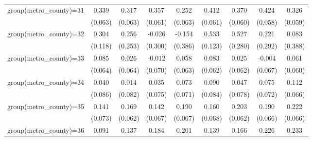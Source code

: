 {\begin{tabular}{l*{8}{c}}
group(metro\_county)=31&       0.339\sym{***}&       0.317\sym{***}&       0.357\sym{***}&       0.252\sym{***}&       0.412\sym{***}&       0.370\sym{***}&       0.424\sym{***}&       0.326\sym{***}\\
                    &     (0.063)         &     (0.063)         &     (0.061)         &     (0.063)         &     (0.061)         &     (0.060)         &     (0.058)         &     (0.059)         \\
group(metro\_county)=32&       0.304\sym{**} &       0.256         &      -0.026         &      -0.154         &       0.533\sym{***}&       0.527\sym{*}  &       0.221         &       0.083         \\
                    &     (0.118)         &     (0.253)         &     (0.300)         &     (0.386)         &     (0.123)         &     (0.280)         &     (0.292)         &     (0.388)         \\
group(metro\_county)=33&       0.085         &       0.026         &      -0.012         &       0.058         &       0.083         &       0.025         &      -0.004         &       0.061         \\
                    &     (0.064)         &     (0.064)         &     (0.070)         &     (0.063)         &     (0.062)         &     (0.062)         &     (0.067)         &     (0.060)         \\
group(metro\_county)=34&       0.040         &       0.014         &       0.035         &       0.073         &       0.090         &       0.047         &       0.075         &       0.112\sym{*}  \\
                    &     (0.086)         &     (0.082)         &     (0.075)         &     (0.071)         &     (0.084)         &     (0.078)         &     (0.072)         &     (0.066)         \\
group(metro\_county)=35&       0.141\sym{*}  &       0.169\sym{**} &       0.142\sym{**} &       0.190\sym{***}&       0.160\sym{**} &       0.203\sym{***}&       0.190\sym{***}&       0.222\sym{***}\\
                    &     (0.073)         &     (0.062)         &     (0.067)         &     (0.067)         &     (0.068)         &     (0.062)         &     (0.066)         &     (0.066)         \\
group(metro\_county)=36&       0.091         &       0.137\sym{**} &       0.184\sym{***}&       0.201\sym{***}&       0.139\sym{**} &       0.166\sym{***}&       0.226\sym{***}&       0.233\sym{***}\\

\end{tabular}}
